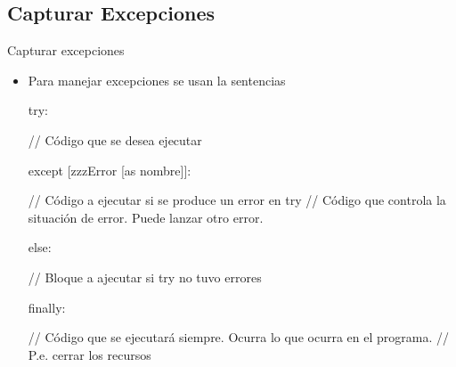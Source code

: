 \documentclass[10pt, envcountsect , spanish]{beamer}
\begin{document}
\subsection{Capturar Excepciones}

\begin{frame}[fragile]{Capturar excepciones} 

\begin{itemize}

\item Para manejar excepciones se usan la sentencias 

\begin{pyverbatim}[][frame=single, fontsize=\scriptsize]
try:

  // Código que se desea ejecutar
  
except [zzzError [as nombre]]: 
 
  // Código a ejecutar si se produce un error en try
  // Código que controla la situación de error. Puede lanzar otro error.
  
else:

  // Bloque a ajecutar si try no tuvo errores
  
finally:

  // Código que se ejecutará siempre. Ocurra lo que ocurra en el programa.
  // P.e. cerrar los recursos
\end{pyverbatim}

\end{itemize}
\end{frame}
\end{document}
